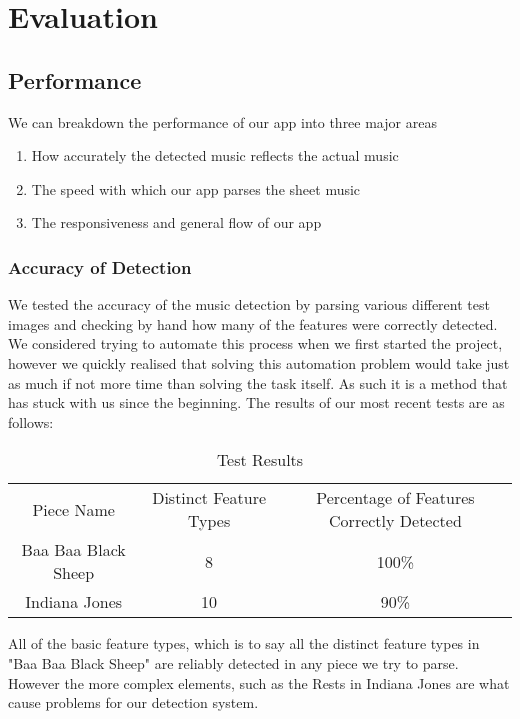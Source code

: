 \section{Evaluation}
    
    \subsection{Performance}
    We can breakdown the performance of our app into three major areas
        \begin{enumerate}
        \item{How accurately the detected music reflects the actual music}
        \item{The speed with which our app parses the sheet music}
        \item{The responsiveness and general flow of our app}
        \end{enumerate}
        \subsubsection{Accuracy of Detection}
            We tested the accuracy of the music detection by parsing various different test images and checking by hand how many of the features were correctly detected. We considered trying to automate this process when we first started the project, however we quickly realised that solving this automation problem would take just as much if not more time than solving the task itself. As such it is a method that has stuck with us since the beginning.
            The results of our most recent tests are as follows:
            \begin{table}[h]
                \centering
                \begin{tabular}{ c | c | c }
                    Piece Name & Distinct Feature Types & Percentage of Features Correctly Detected \\
                    Baa Baa Black Sheep & 8 & 100\% \\
                    Indiana Jones & 10 & 90\%\\
                \end{tabular}
                \caption{Test Results}
                \label{table:testresults}
            \end{table}
            All of the basic feature types, which is to say all the distinct feature types in "Baa Baa Black Sheep" are reliably detected in any piece we try to parse. However the more complex elements, such as the Rests in Indiana Jones are what cause problems for our detection system.
